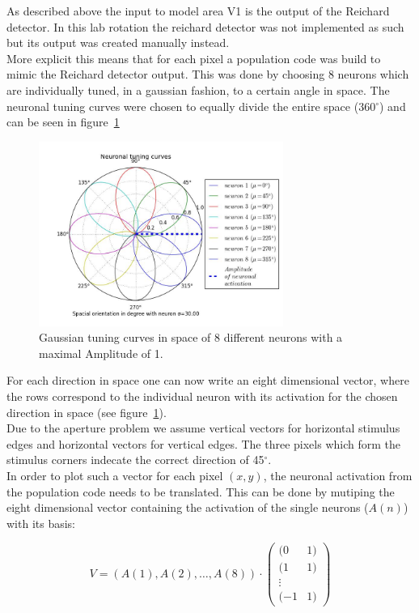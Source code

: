 \documentclass[a4paper]{article}
\begin{document}
As described above the input to model area V1 is the output of the Reichard detector.
In this lab rotation the reichard detector was not implemented as such but its output was created manually instead.\\
More explicit this means that for each pixel a population code was build to mimic the Reichard detector output. This was done by choosing 8 neurons which are individually tuned, in a gaussian fashion, to a certain angle in space. The neuronal tuning curves were chosen to equally divide the entire space (360$^{\circ}$) and can be seen in figure~\ref{fig:neuronGauss}

\vspace{0.5cm}
\begin{figure}[ht]
\centering
\includegraphics[width=8cm]{pics/neuronGauss}
\caption{Gaussian tuning curves in space of 8 different neurons with a maximal Amplitude of 1.}
\label{fig:neuronGauss}
\end{figure}
\vspace{0.5cm}

For each direction in space one can now write an eight dimensional vector, where the rows correspond to the individual neuron with its activation for the chosen direction in space (see figure~\ref{fig:neuronGauss}).\\
Due to the aperture problem we assume vertical vectors for horizontal stimulus edges and horizontal vectors for vertical edges. The three pixels which form the stimulus corners indecate the correct direction of 45$^{\circ}$.\\
In order to plot such a vector for each pixel $(x,y)$, the neuronal activation from the population code needs to be translated. This can be done by mutiping the eight dimensional vector containing the activation of the single neurons ($A(n)$) with its basis:

\begin{equation}
V=\left(A(1),A(2),\hdots, A(8)\right) \cdot \begin{pmatrix} (0&1) \\ (1&1)\\ \vdots\\ (-1&1)\end{pmatrix}
\label{vector1}
\end{equation}
\end{document}
